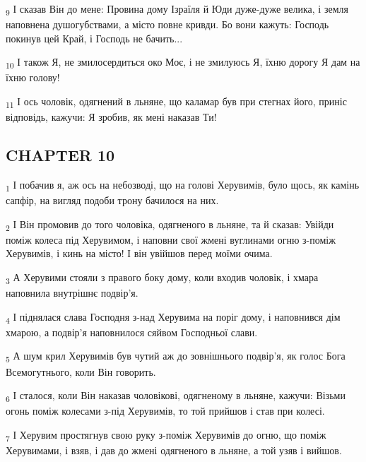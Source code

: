 \begin{tcolorbox}
\textsubscript{9} І сказав Він до мене: Провина дому Ізраїля й Юди дуже-дуже велика, і земля наповнена душогубствами, а місто повне кривди. Бо вони кажуть: Господь покинув цей Край, і Господь не бачить...
\end{tcolorbox}
\begin{tcolorbox}
\textsubscript{10} І також Я, не змилосердиться око Моє, і не змилуюсь Я, їхню дорогу Я дам на їхню голову!
\end{tcolorbox}
\begin{tcolorbox}
\textsubscript{11} І ось чоловік, одягнений в льняне, що каламар був при стегнах його, приніс відповідь, кажучи: Я зробив, як мені наказав Ти!
\end{tcolorbox}
\subsection{CHAPTER 10}
\begin{tcolorbox}
\textsubscript{1} І побачив я, аж ось на небозводі, що на голові Херувимів, було щось, як камінь сапфір, на вигляд подоби трону бачилося на них.
\end{tcolorbox}
\begin{tcolorbox}
\textsubscript{2} І Він промовив до того чоловіка, одягненого в льняне, та й сказав: Увійди поміж колеса під Херувимом, і наповни свої жмені вуглинами огню з-поміж Херувимів, і кинь на місто! І він увійшов перед моїми очима.
\end{tcolorbox}
\begin{tcolorbox}
\textsubscript{3} А Херувими стояли з правого боку дому, коли входив чоловік, і хмара наповнила внутрішнє подвір'я.
\end{tcolorbox}
\begin{tcolorbox}
\textsubscript{4} І піднялася слава Господня з-над Херувима на поріг дому, і наповнився дім хмарою, а подвір'я наповнилося сяйвом Господньої слави.
\end{tcolorbox}
\begin{tcolorbox}
\textsubscript{5} А шум крил Херувимів був чутий аж до зовнішнього подвір'я, як голос Бога Всемогутнього, коли Він говорить.
\end{tcolorbox}
\begin{tcolorbox}
\textsubscript{6} І сталося, коли Він наказав чоловікові, одягненому в льняне, кажучи: Візьми огонь поміж колесами з-під Херувимів, то той прийшов і став при колесі.
\end{tcolorbox}
\begin{tcolorbox}
\textsubscript{7} І Херувим простягнув свою руку з-поміж Херувимів до огню, що поміж Херувимами, і взяв, і дав до жмені одягненого в льняне, а той узяв і вийшов.
\end{tcolorbox}
